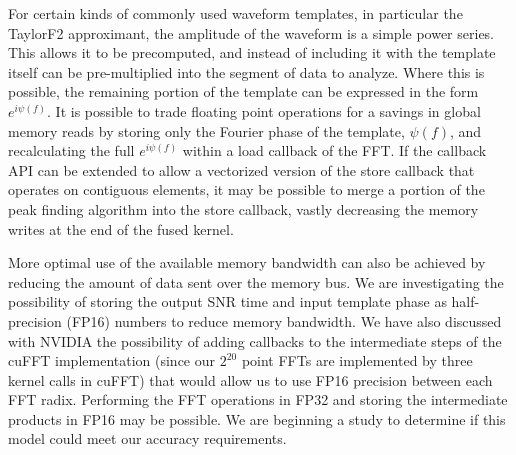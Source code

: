 For certain kinds of commonly used waveform templates, in particular the
TaylorF2 approximant, the amplitude of the waveform is a simple power series.
This allows it to be precomputed, and instead of including it with the
template itself can be pre-multiplied into the segment of data to analyze.
Where this is possible, the remaining portion of the template can be expressed
in the form $e^{i\psi(f)}$. It is possible to trade floating point operations
for a savings in global memory reads by storing only the Fourier phase of the
template, $\psi(f)$, and recalculating the full $e^{i\psi(f)}$ within a load
callback of the FFT.  If the callback API can be extended to allow a
vectorized version of the store callback that operates on contiguous
elements, it may be possible to merge a portion of the peak finding algorithm
into the store callback, vastly decreasing the memory writes at the end of the
fused kernel.


More optimal use of the available memory bandwidth can also be achieved by
reducing the amount of data sent over the memory bus. We are investigating the
possibility of storing the output SNR time and input template phase as
half-precision (FP16) numbers to reduce memory bandwidth. We have also
discussed with NVIDIA the possibility of adding callbacks to the intermediate
steps of the cuFFT implementation (since our $2^{20}$ point FFTs are
implemented by three kernel calls in cuFFT) that would allow us to use FP16
precision between each FFT radix. Performing the FFT operations
in FP32 and storing the intermediate products in FP16 may be possible. We are beginning
a study to determine if this model could meet our accuracy requirements.

